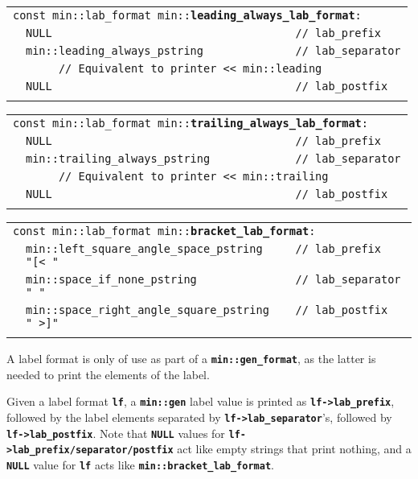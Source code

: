 \documentclass[12pt]{article}
\makeatletter
\newcommand{\TT}[1]{{\tt \bfseries #1}}
\newcommand{\ttindex}[1]{\index{#1@{\tt #1}}}
\newcommand{\EOL}{\penalty \exhyphenpenalty}
\newenvironment{indpar}[1][0.3in]%
	{\begin{list}{}%
		     {\setlength{\itemsep}{0in}%
		      \setlength{\topsep}{0in}%
		      \setlength{\parsep}{1ex}%
		      \setlength{\labelwidth}{#1}%
		      \setlength{\leftmargin}{#1}%
		      \addtolength{\leftmargin}{\labelsep}}%
	 \item}%
	{\end{list}}
\newcommand{\LABEL}[1]{\label{#1}}
\newlength{\ARGBREAKLENGTH}
\newcommand{\ARGBREAK}[1][\ARGBREAKLENGTH]{\\&\hspace*{#1}}
\newcommand{\MINKEY}[1]%
	   {\TT{#1}\ttindex{min::#1}\ttindex{#1}}
\makeatother
\begin{document}
\begin{indpar}[1em]\begin{tabular}{r@{}l}
\multicolumn{2}{l}{\tt const min::lab\_format
                   min::\MINKEY{leading\_always\_lab\_format}:}
\LABEL{MIN::LEADING_ALWAYS_LAB_FORMAT}\ARGBREAK
\verb|NULL                                     // lab_prefix|\ARGBREAK
\verb|min::leading_always_pstring              // lab_separator|\ARGBREAK
\verb|     // Equivalent to printer << min::leading|\ARGBREAK
\verb|NULL                                     // lab_postfix|\ARGBREAK
\end{tabular}\end{indpar}

\begin{indpar}[1em]\begin{tabular}{r@{}l}
\multicolumn{2}{l}{\tt const min::lab\_format
                   min::\MINKEY{trailing\_always\_lab\_format}:}
\LABEL{MIN::TRAILING_ALWAYS_LAB_FORMAT}\ARGBREAK
\verb|NULL                                     // lab_prefix|\ARGBREAK
\verb|min::trailing_always_pstring             // lab_separator|\ARGBREAK
\verb|     // Equivalent to printer << min::trailing|\ARGBREAK
\verb|NULL                                     // lab_postfix|\ARGBREAK
\end{tabular}\end{indpar}

\begin{indpar}[1em]\begin{tabular}{r@{}l}
\multicolumn{2}{l}{\tt const min::lab\_format
                   min::\MINKEY{bracket\_lab\_format}:}
\LABEL{MIN::BRACKET_LAB_FORMAT}\ARGBREAK
\verb|min::left_square_angle_space_pstring     // lab_prefix    "[< "|\ARGBREAK
\verb|min::space_if_none_pstring               // lab_separator " "|\ARGBREAK
\verb|min::space_right_angle_square_pstring    // lab_postfix   " >]"|\ARGBREAK
\end{tabular}\end{indpar}

A label format is only of use as part of a \TT{min::\EOL gen\_\EOL format},
as the latter is needed to print the elements of the label.

Given a label format \TT{lf}, a \TT{min::gen} label value is printed as
\TT{lf->\EOL lab\_\EOL prefix}, followed by the label elements separated by
\TT{lf->\EOL lab\_\EOL separator}'s, followed by
\TT{lf->\EOL lab\_\EOL postfix}.  Note that \TT{NULL} values for
\TT{lf->\EOL lab\_\EOL prefix/separator/postfix} act like empty strings
that print nothing, and a \TT{NULL} value for \TT{lf} acts like
\TT{min::\EOL bracket\_\EOL lab\_\EOL format}.
\end{document}

